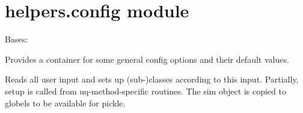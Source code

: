 \documentclass[letterpaper,10pt,english]{sphinxmanual}
\begin{document}
\section{helpers.config module}
\label{\detokenize{helpers:module-helpers.config}}\label{\detokenize{helpers:helpers-config-module}}

\begin{fulllineitems}
\label{\detokenize{helpers:helpers.config.GeneralConfig}}
Bases: {\hyperref[\detokenize{helpers:helpers.baseclass.BaseClass}]{}}

Provides a container for some general config options and their
default values.

\begin{fulllineitems}
\label{\detokenize{helpers:helpers.config.GeneralConfig.copy_to_globels}}
\end{fulllineitems}


\begin{fulllineitems}
\label{\detokenize{helpers:helpers.config.GeneralConfig.defaults_}}
\end{fulllineitems}


\end{fulllineitems}


\begin{fulllineitems}
\label{\detokenize{helpers:helpers.config.config}}
Reads all user input and sets up (sub-)classes according to this
input.
Partially, setup is called from uq-method-specific routines.
The sim object is copied to globels to be available for pickle.

\end{fulllineitems}
\end{document}
